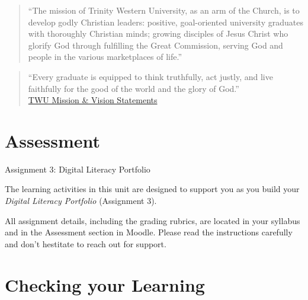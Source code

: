 \documentclass[
]{book}
\theoremstyle{definition}
\theoremstyle{definition}
\theoremstyle{definition}
\theoremstyle{definition}
\theoremstyle{remark}
\begin{document}
\begin{quote}
``The mission of Trinity Western University, as an arm of the Church, is to develop godly Christian leaders: positive, goal-oriented university graduates with thoroughly Christian minds; growing disciples of Jesus Christ who glorify God through fulfilling the Great Commission, serving God and people in the various marketplaces of life.''
\end{quote}

\begin{quote}
``Every graduate is equipped to think truthfully, act justly, and live faithfully for the good of the world and the glory of God.''\\
\href{https://www.twu.ca/about-us/commitments/mission-vision}{TWU Mission \& Vision Statements}
\end{quote}

\hypertarget{assessment-5}{%
\section*{Assessment}\label{assessment-5}}

\begin{assessment}
{Assignment 3: Digital Literacy Portfolio}

The learning activities in this unit are designed to support you as you build your \emph{Digital Literacy Portfolio} (Assignment 3).

All assignment details, including the grading rubrics, are located in your syllabus and in the Assessment section in Moodle. Please read the instructions carefully and don't hestitate to reach out for support.
\end{assessment}

\hypertarget{checking-your-learning-5}{%
\section*{Checking your Learning}\label{checking-your-learning-5}}
\end{document}
